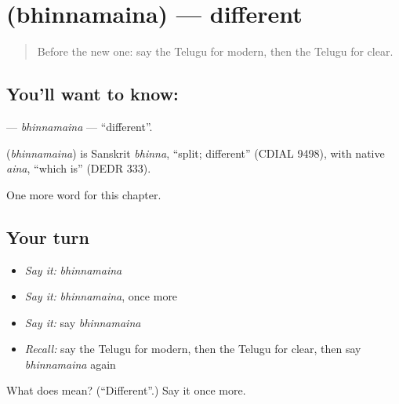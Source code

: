 \section[\texorpdfstring{\te{భిన్నమైన} (bhinnamaina)}{భిన్నమైన (bhinnamaina)}]{ (bhinnamaina) — different}

\label{lesson:TE-C222-bhinnamaina}



\begin{quote}
Before the new one: say the Telugu for modern, then the Telugu for clear.
\end{quote}

\subsection*{You'll want to know: }
\textbf{} — \emph{bhinnamaina} — \textquotedblleft{}different\textquotedblright{}.

\begin{cousinweb}
\textbf{} (\emph{bhinnamaina}) is Sanskrit \emph{bhinna}, \textquotedblleft{}split; different\textquotedblright{} (CDIAL 9498), with native \emph{aina}, \textquotedblleft{}which is\textquotedblright{} (DEDR 333).
\end{cousinweb}

\begin{grammarlens}[title={What you've built}]
One more word for this chapter.
\end{grammarlens}

\subsection*{Your turn}
\begin{itemize}
\raggedright
  \item \emph{Say it:} \emph{bhinnamaina}
  \item \emph{Say it:} \emph{bhinnamaina}, once more
  \item \emph{Say it:} say \emph{bhinnamaina}
  \item \emph{Recall:} say the Telugu for modern, then the Telugu for clear, then say \emph{bhinnamaina} again
\end{itemize}

\begin{tcolorbox}[breakable,colback=teal!4,colframe=teal!35!black,title={Before you move on}]
What does  mean? (\textquotedblleft{}Different\textquotedblright{}.) Say it once more.
\end{tcolorbox}
